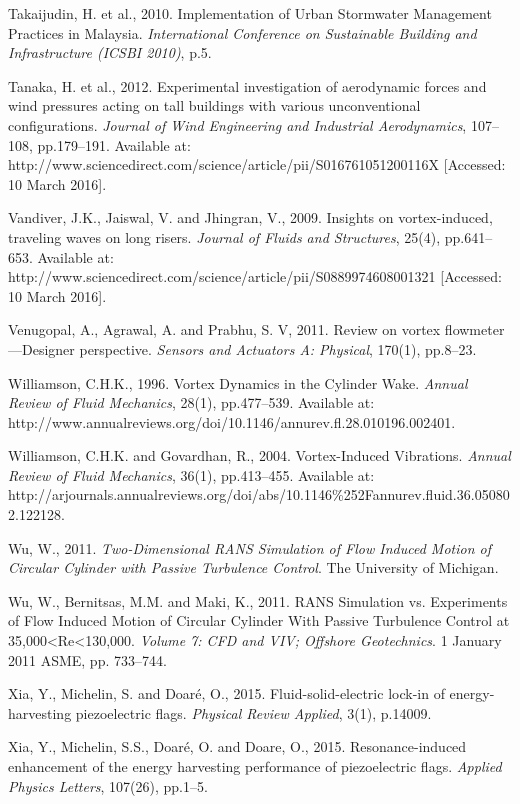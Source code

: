 \documentclass[]{article}
\begin{document}
Takaijudin, H. et al., 2010. Implementation of Urban Stormwater
Management Practices in Malaysia. \emph{International Conference on
Sustainable Building and Infrastructure (ICSBI 2010)}, p.5.

Tanaka, H. et al., 2012. Experimental investigation of aerodynamic
forces and wind pressures acting on tall buildings with various
unconventional configurations. \emph{Journal of Wind Engineering and
Industrial Aerodynamics}, 107--108, pp.179--191. Available at:
http://www.sciencedirect.com/science/article/pii/S016761051200116X
{[}Accessed: 10 March 2016{]}.

Vandiver, J.K., Jaiswal, V. and Jhingran, V., 2009. Insights on
vortex-induced, traveling waves on long risers. \emph{Journal of Fluids
and Structures}, 25(4), pp.641--653. Available at:
http://www.sciencedirect.com/science/article/pii/S0889974608001321
{[}Accessed: 10 March 2016{]}.

Venugopal, A., Agrawal, A. and Prabhu, S. V, 2011. Review on vortex
flowmeter---Designer perspective. \emph{Sensors and Actuators A:
Physical}, 170(1), pp.8--23.

Williamson, C.H.K., 1996. Vortex Dynamics in the Cylinder Wake.
\emph{Annual Review of Fluid Mechanics}, 28(1), pp.477--539. Available
at:
http://www.annualreviews.org/doi/10.1146/annurev.fl.28.010196.002401.

Williamson, C.H.K. and Govardhan, R., 2004. Vortex-Induced Vibrations.
\emph{Annual Review of Fluid Mechanics}, 36(1), pp.413--455. Available
at:
http://arjournals.annualreviews.org/doi/abs/10.1146\%252Fannurev.fluid.36.050802.122128.

Wu, W., 2011. \emph{Two-Dimensional RANS Simulation of Flow Induced
Motion of Circular Cylinder with Passive Turbulence Control}. The
University of Michigan.

Wu, W., Bernitsas, M.M. and Maki, K., 2011. RANS Simulation vs.
Experiments of Flow Induced Motion of Circular Cylinder With Passive
Turbulence Control at 35,000\textless{}Re\textless{}130,000.
\emph{Volume 7: CFD and VIV; Offshore Geotechnics}. 1 January 2011 ASME,
pp. 733--744.

Xia, Y., Michelin, S. and Doaré, O., 2015. Fluid-solid-electric lock-in
of energy-harvesting piezoelectric flags. \emph{Physical Review
Applied}, 3(1), p.14009.

Xia, Y., Michelin, S.S., Doaré, O. and Doare, O., 2015.
Resonance-induced enhancement of the energy harvesting performance of
piezoelectric flags. \emph{Applied Physics Letters}, 107(26), pp.1--5.
\end{document}
